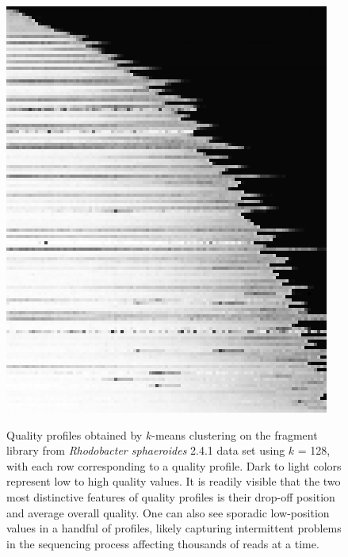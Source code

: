 \begin{figure}[!tpb]%
\begin{center}
\includegraphics[width=.9\textwidth]{profiles_128.png}
\end{center}
\renewcommand{\baselinestretch}{1}
\small\normalsize
\begin{quote}
\caption[Quality profiles obtained by $k$-means clustering on the
  fragment library from \textit{Rhodobacter sphaeroides} 2.4.1 data
  set]{Quality profiles obtained by $k$-means clustering on the
  fragment library from \textit{Rhodobacter sphaeroides} 2.4.1 data
  set using $k$ = 128, with each row corresponding to a quality
  profile. Dark to light colors represent low to high quality
  values. It is readily visible that the two most distinctive features
  of quality profiles is their drop-off position and average overall
  quality. One can also see sporadic low-position values in a handful
  of profiles, likely capturing intermittent problems in the
  sequencing process affecting thousands of reads at a
  time.}
  \label{fig:profiles_128}
\end{quote}
\end{figure}
\renewcommand{\baselinestretch}{2}
\small\normalsize

